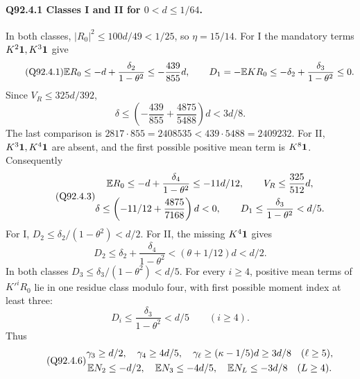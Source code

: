 \paragraph{Q92.4.1 Classes I and II for \(0<\allowbreak d\le\allowbreak 1/64\).}
In both classes, \(|R_0|^2\le\allowbreak 100d/49<\allowbreak 1/25\), so \(\eta=\allowbreak 15/14\).
For I the mandatory terms \(K^2\mathbf1,\allowbreak K^3\mathbf1\) give
\begin{equation}\tag{Q92.4.1}\label{eq:Q92:4.1}
\mathbb E R_0\le-d+\frac{\delta_2}{1-\theta^2}\le-\frac{439}{855}d,
\qquad D_1=-\mathbb E KR_0\le-\delta_2+\frac{\delta_3}{1-\theta^2}\le0.
\end{equation}
Since \(V_R\le\allowbreak 325d/392\),
\begin{equation}\tag{Q92.4.2}\label{eq:Q92:4.2}
\delta\le\left(-\frac{439}{855}+\frac{4875}{5488}\right)d<3d/8.
\end{equation}
The last comparison is \(2817\cdot855=\allowbreak 2408535<\allowbreak 439\cdot5488=\allowbreak 2409232\).
For II, \(K^3\mathbf1,\allowbreak K^4\mathbf1\) are absent, and the first possible
positive mean term is \(K^8\mathbf1\). Consequently
\begin{equation}\tag{Q92.4.3}\label{eq:Q92:4.3}
\begin{gathered}
\mathbb E R_0\le-d+\frac{\delta_4}{1-\theta^2}\le-11d/12,
\qquad V_R\le\frac{325}{512}d,\\
\delta\le\left(-11/12+\frac{4875}{7168}\right)d<0,
\qquad D_1\le\frac{\delta_3}{1-\theta^2}<d/5.
\end{gathered}
\end{equation}
For I, \(D_2\le\allowbreak \delta_2/(1-\theta^2)<\allowbreak d/2\). For II, the missing
\(K^4\mathbf1\) gives
\begin{equation}\tag{Q92.4.4}\label{eq:Q92:4.4}
D_2\le\delta_2+\frac{\delta_4}{1-\theta^2}
<(\theta+1/12)d<d/2.
\end{equation}
In both classes \(D_3\le\allowbreak \delta_3/(1-\theta^2)<\allowbreak d/5\).
For every \(i\ge\allowbreak 4\), positive mean terms of \(K'^iR_0\) lie in one
residue class modulo four, with first possible moment index at least three:
\begin{equation}\tag{Q92.4.5}\label{eq:Q92:4.5}
D_i\le\frac{\delta_3}{1-\theta^2}<d/5\qquad(i\ge4).
\end{equation}
Thus
\begin{equation}\tag{Q92.4.6}\label{eq:Q92:4.6}
\begin{gathered}
\gamma_3\ge d/2,\quad\gamma_4\ge4d/5,\quad
\gamma_\ell\ge(\kappa-1/5)d\ge3d/8\quad(\ell\ge5),\\
\mathbb E N_2\le-d/2,\quad\mathbb E N_3\le-4d/5,\quad
\mathbb E N_L\le-3d/8\quad(L\ge4).
\end{gathered}
\end{equation}

